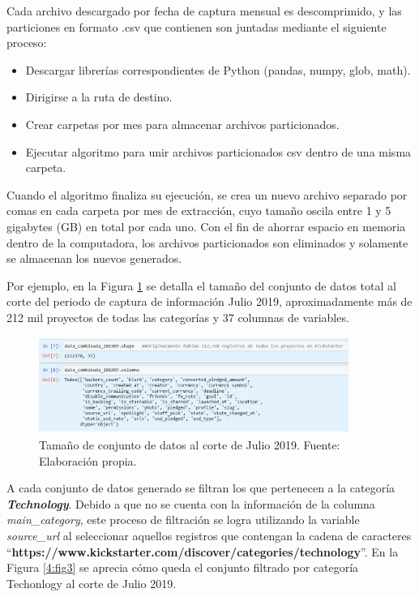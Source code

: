 Cada archivo descargado por fecha de captura mensual es descomprimido, y las particiones en formato .csv que contienen son juntadas mediante el siguiente proceso:

\begin{itemize}
	\item Descargar librerías correspondientes de Python (pandas, numpy, glob, math).
	\item Dirigirse a la ruta de destino.
	\item Crear carpetas por mes para almacenar archivos particionados.
	\item Ejecutar algoritmo para unir archivos particionados csv dentro de una misma carpeta.
\end{itemize}

Cuando el algoritmo finaliza su ejecución, se crea un nuevo archivo separado por comas en cada carpeta por mes de extracción, cuyo tamaño oscila entre 1 y 5 gigabytes (GB) en total por cada uno. Con el fin de ahorrar espacio en memoria dentro de la computadora, los archivos particionados son eliminados y solamente se almacenan los nuevos generados.

Por ejemplo, en la Figura \ref{4:fig2} se detalla el tamaño del conjunto de datos total al corte del periodo de captura de información Julio 2019, aproximadamente más de 212 mil proyectos de todas las categorías y 37 columnas de variables.

\begin{figure}[h]
	\begin{center}
		\includegraphics[width=0.9\textwidth]{4/figures/dataset_201907.png}
		\caption{Tamaño de conjunto de datos al corte de Julio 2019. Fuente: Elaboración propia.}
		\label{4:fig2}
	\end{center}
\end{figure}

A cada conjunto de datos generado se filtran los que pertenecen a la categoría \textit{\textbf{Technology}}. Debido a que no se cuenta con la información de la columna \textit{main\_category}, este proceso de filtración se logra utilizando la variable \textit{source\_url} al seleccionar aquellos registros que contengan la cadena de caracteres “\textbf{https://www.kickstarter.com/discover/categories/technology}”. En la Figura \ref{4:fig3} se aprecia cómo queda el conjunto filtrado por categoría Techonlogy al corte de Julio 2019.

